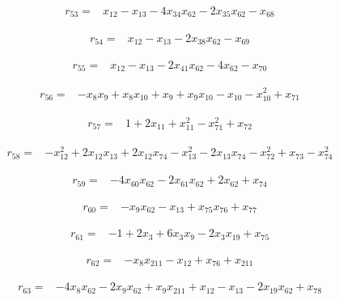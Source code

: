 \documentclass[10pt,letterpaper]{article}
\theoremstyle{remark}\newtheorem{remark}[theorem]{Remark}
\begin{document}
\begin{align*}
r_{53}={}&x_{12}-x_{13}-4x_{34}x_{62}-2x_{35}x_{62}-x_{68}
\end{align*}

\begin{align*}
r_{54}={}&x_{12}-x_{13}-2x_{38}x_{62}-x_{69}
\end{align*}

\begin{align*}
r_{55}={}&x_{12}-x_{13}-2x_{41}x_{62}-4x_{62}-x_{70}
\end{align*}

\begin{align*}
r_{56}={}&-x_{8}x_{9}+x_{8}x_{10}+x_{9}+x_{9}x_{10}-x_{10}-x_{10}^{2}+x_{71}
\end{align*}

\begin{align*}
r_{57}={}&1+2x_{11}+x_{11}^{2}-x_{71}^{2}+x_{72}
\end{align*}

\begin{align*}
r_{58}={}&-x_{12}^{2}+2x_{12}x_{13}+2x_{12}x_{74}-x_{13}^{2}-2x_{13}x_{74}-x_{72}^{2}+x_{73}-x_{74}^{2}
\end{align*}

\begin{align*}
r_{59}={}&-4x_{60}x_{62}-2x_{61}x_{62}+2x_{62}+x_{74}
\end{align*}

\begin{align*}
r_{60}={}&-x_{9}x_{62}-x_{13}+x_{75}x_{76}+x_{77}
\end{align*}

\begin{align*}
r_{61}={}&-1+2x_{3}+6x_{3}x_{9}-2x_{3}x_{19}+x_{75}
\end{align*}

\begin{align*}
r_{62}={}&-x_{8}x_{211}-x_{12}+x_{76}+x_{211}
\end{align*}

\begin{align*}
r_{63}={}&-4x_{8}x_{62}-2x_{9}x_{62}+x_{9}x_{211}+x_{12}-x_{13}-2x_{19}x_{62}+x_{78}
\end{align*}
\end{document}
